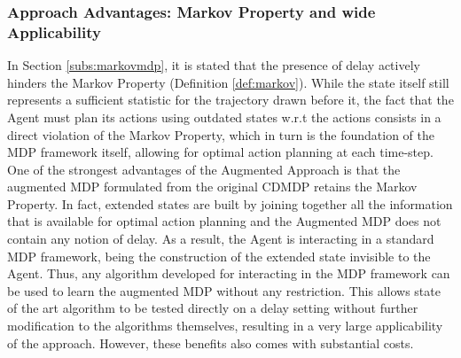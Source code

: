             \subsubsection{Approach Advantages: Markov Property and wide Applicability}
                In Section \ref{subs:markovmdp}, it is stated that the presence of delay actively hinders the Markov Property (Definition \ref{def:markov}). While the state itself still represents a sufficient statistic for the trajectory drawn before it, the fact that the Agent must plan its actions using outdated states w.r.t the actions consists in a direct violation of the Markov Property, which in turn is the foundation of the MDP framework itself, allowing for optimal action planning at each time-step. \newline
                One of the strongest advantages of the Augmented Approach is that the augmented MDP formulated from the original CDMDP retains the Markov Property. In fact, extended states are built by joining together all the information that is available for optimal action planning and the Augmented MDP does not contain any notion of delay. As a result, the Agent is interacting in a standard MDP framework, being the construction of the extended state invisible to the Agent. \newline
                Thus, any algorithm developed for interacting in the MDP framework can be used to learn the augmented MDP without any restriction. This allows state of the art algorithm to be tested directly on a delay setting without further modification to the algorithms themselves, resulting in a very large applicability of the approach. However, these benefits also comes with substantial costs.
                
